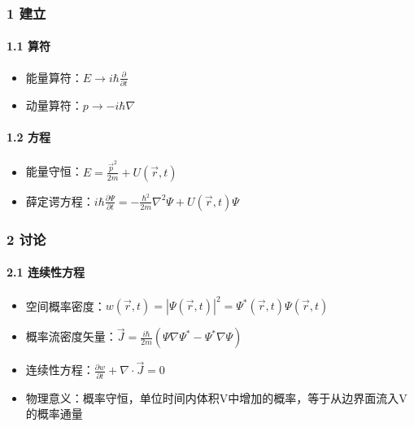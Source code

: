 \documentclass[UTF8,twocolumn]{ctexart}
\providecommand{\tightlist}{%
  \setlength{\itemsep}{0pt}\setlength{\parskip}{0pt}}
\let\oldparagraph\paragraph
\renewcommand{\paragraph}[1]{\oldparagraph{#1}\mbox{}}
\begin{document}
\hypertarget{ux5efaux7acb}{%
\subsubsection{1 建立}\label{ux5efaux7acb}}

\hypertarget{ux7b97ux7b26}{%
\paragraph{{ }1.1 算符}\label{ux7b97ux7b26}}

\begin{itemize}
\tightlist
\item
  能量算符：\(E\to i\hbar\frac{\partial}{\partial t}\)
\item
  动量算符：\(p\to -i\hbar\nabla\)
\end{itemize}

\hypertarget{ux65b9ux7a0b}{%
\paragraph{{ }1.2 方程}\label{ux65b9ux7a0b}}

\begin{itemize}
\tightlist
\item
  能量守恒：\(E=\frac{\vec{p}^2}{2m}+U(\vec{r},t)\)
\item
  薛定谔方程：\(i\hbar\frac{\partial\Psi}{\partial t}=-\frac{\hbar^2}{2m}\nabla^2\Psi+U(\vec{r},t)\Psi\)
\end{itemize}

\hypertarget{ux8ba8ux8bba-1}{%
\subsubsection{2 讨论}\label{ux8ba8ux8bba-1}}

\hypertarget{ux8fdeux7eedux6027ux65b9ux7a0b}{%
\paragraph{{ }2.1 连续性方程}\label{ux8fdeux7eedux6027ux65b9ux7a0b}}

\begin{itemize}
\tightlist
\item
  空间概率密度：\(w(\vec{r},t)=|\Psi(\vec{r},t)|^2=\Psi^*(\vec{r},t)\Psi(\vec{r},t)\)
\item
  概率流密度矢量：\(\vec{J}=\frac{i\hbar}{2m}(\Psi\nabla\Psi^* -\Psi^*\nabla\Psi)\)
\item
  连续性方程：\(\frac{\partial w}{\partial t}+\nabla\cdot\vec{J}=0\)
\item
  物理意义：概率守恒，单位时间内体积V中增加的概率，等于从边界面流入V的概率通量
\end{itemize}
\end{document}
